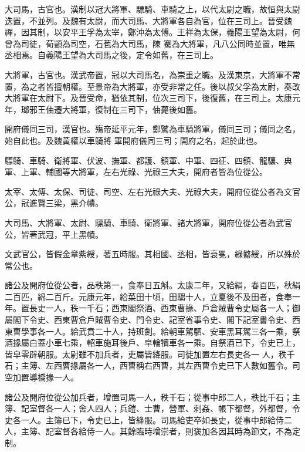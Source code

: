 \begin{pinyinscope}
 大司馬，古官也。漢制以冠大將軍、驃騎、車騎之上，以代太尉之職，故恒與太尉迭置，不並列。及魏有太尉，而大司馬、大將軍各自為官，位在三司上。晉受魏禪，因其制，以安平王孚為太宰，鄭沖為太傅。王祥為太保，義陽王望為太尉，何曾為司徒，荀顗為司空，石苞為大司馬，陳
 騫為大將軍，凡八公同時並置，唯無丞相焉。自義陽王望為大司馬之後，定令如舊，在三司上。



 大將軍，古官也。漢武帝置，冠以大司馬名，為崇重之職。及漢東京，大將軍不常置，為之者皆擅朝權。至景帝為大將軍，亦受非常之任。後以叔父孚為太尉，奏改大將軍在太尉下。及晉受命，猶依其制，位次三司下，後復舊，在三司上。太康元年，瑯邪王伷遷大將軍，復制在三司下，伷薨後如舊。



 開府儀同三司，漢官也。殤帝延平元年，鄭騭為車騎將軍，儀同三司；儀同之名，始自此也。及魏黃權以車騎將
 軍開府儀同三司；開府之名，起於此也。



 驃騎、車騎、衛將軍、伏波、撫軍、都護、鎮軍、中軍、四征、四鎮、龍驤、典軍、上軍、輔國等大將軍，左右光祿、光祿三大夫，開府者皆為位從公。



 太宰、太傅、太保、司徒、司空、左右光祿大夫、光祿大夫，開府位從公者為文官公，冠進賢三梁，黑介幘。



 大司馬、大將軍、太尉、驃騎、車騎、衛將軍、諸大將軍，開府位從公者為武官公，皆著武冠，平上黑幘。



 文武官公，皆假金章紫綬，著五時服。其相國、丞相，皆袞冕，綠盭綬，所以殊於常公也。



 諸公及開府位從公者，品秩第一，食奉日五斛。太康二年，又給絹，春百匹，秋絹二百匹，綿二百斤。元康元年，給菜田十頃，田騶十人，立夏後不及田者，食奉一年。置長史一人，秩一千石；西東閣祭酒、西東曹掾、戶倉賊曹令史屬各一人；御屬閣下令史、西東曹倉戶賊曹令史、門令史、記室省事令史、閣下記室書令史、西東曹學事各一人。給武賁二十人，持班劍。給朝車駕駟、安車黑耳駕三各一乘，祭酒掾屬白蓋小車七乘，軺車施耳後戶、皁輪犢車各一乘。自祭酒已下，令史已上，皆皁零辟朝服。太尉雖不加兵者，吏屬皆絳服。司徒加置左右長史各一
 人，秩千石；主簿、左西曹掾屬各一人，西曹稱右西曹，其左西曹令史已下人數如舊令。司空加置導橋掾一人。



 諸公及開府位從公加兵者，增置司馬一人，秩千石；從事中郎二人，秩比千石；主簿、記室督各一人；舍人四人；兵鎧、士曹，營軍、刺姦、帳下都督，外都督，令史各一人。主簿已下，令史已上，皆絳服。司馬給吏卒如長史，從事中郎給侍二人，主簿、記室督各給侍一人。其餘臨時增崇者，則褒加各因其時為節文，不為定制。




\end{pinyinscope}
